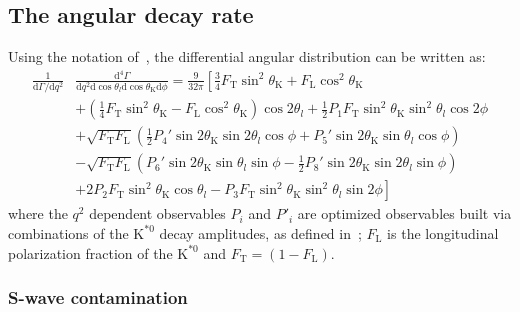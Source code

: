
\subsection{The angular decay rate}
\label{sec:decRate}

Using the notation of~\cite{Ball2009}, the differential angular distribution can be written as:
\begin{equation} \label{eq:Angular}
  \begin{split}
    \frac{1}{\mathrm{d}\Gamma/\mathrm{d}q^2}&\frac{\mathrm{d}^4\Gamma}{\mathrm{d}q^2 \mathrm{d}\cos\theta_l \mathrm{d}\cos\theta_\mathrm{K} \mathrm{d}\phi} =\frac{9}{32\pi}\left[\frac{3}{4}F_\mathrm{T}\sin^2\theta_\mathrm{K} + F_\mathrm{L}\cos^2\theta_\mathrm{K} \right.\\
      &\left.+\left(\frac{1}{4}F_\mathrm{T}\sin^2\theta_\mathrm{K}-F_\mathrm{L}\cos^2\theta_\mathrm{K}\right)\cos2\theta_l+\frac{1}{2}P_1F_\mathrm{T}\sin^2\theta_\mathrm{K}\sin^2\theta_l\cos 2\phi \right.\\
      &+\sqrt{F_\mathrm{T}F_\mathrm{L}}\left(\frac{1}{2}P_4'\sin2\theta_\mathrm{K}\sin2\theta_l\cos\phi+P_5'\sin2\theta_\mathrm{K}\sin\theta_l\cos\phi \right)\\
      &-\sqrt{F_\mathrm{T}F_\mathrm{L}}\left(P_6'\sin2\theta_\mathrm{K}\sin\theta_l\sin\phi-\frac{1}{2}P_8'\sin2\theta_\mathrm{K}\sin2\theta_l\sin\phi \right)\\
      &\left.+2P_2F_\mathrm{T}\sin^2\theta_\mathrm{K}\cos\theta_l-P_3F_\mathrm{T}\sin^2\theta_\mathrm{K}\sin^2\theta_l\sin2\phi \right]
  \end{split}
\end{equation}
where the $q^2$ dependent observables $P_i$ and $P'_i$ are optimized observables built via combinations of the $\text{K}^{*0}$ decay amplitudes, as defined in~\cite{Genon:Swave}; $F_\mathrm{L}$ is the longitudinal polarization fraction of the $\text{K}^{*0}$ and $F_\mathrm{T}=(1-F_\mathrm{L})$.

\subsubsection{S-wave contamination}
\label{sec:S-waveform}

